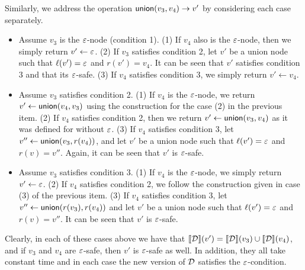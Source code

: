 	
	Similarly, we address the operation $\mathsf{union}(v_3, v_4) \to v'$ by considering each case separately.
	\begin{itemize}
		\item Assume $v_3$ is the $\varepsilon$-node (condition 1). (1) If $v_4$ also is the $\varepsilon$-node, then we simply return $v'\gets\varepsilon$. (2) If $v_3$ satisfies condition 2, let $v'$ be a union node such that $\ell(v') = \varepsilon$ and $r(v') = v_4$. It can be seen that $v'$ satisfies condition 3 and that its $\varepsilon$-safe. (3) If $v_4$ satisfies condition 3, we simply return $v'\gets v_4$.
		\item Assume $v_3$ satisfies condition 2. (1) If $v_4$ is the $\varepsilon$-node, we return $v'\gets \mathsf{union}( v_4, v_3)$ using the construction for the case (2) in the previous item. (2) If $v_4$ satisfies condition 2, then we return $v'\gets \mathsf{union}( v_3, v_4)$ as it was defined for \dsabbrs without $\varepsilon$. (3) If $v_4$ satisfies condition 3, let $v'' \gets \mathsf{union}( v_3, r(v_4))$, and let $v'$ be a union node such that $\ell(v') = \varepsilon$ and $r(v) = v''$. Again, it can be seen that $v'$ is $\varepsilon$-safe.
		\item Assume $v_3$ satisfies condition 3. (1) If $v_4$ is the $\varepsilon$-node, we simply return $v'\gets\varepsilon$. (2) If $v_4$ satisfies condition 2, we follow the construction given in case (3) of the previous item. (3) If $v_4$ satisfies condition 3, let $v''\gets\mathsf{union}( r(v_3), r(v_4))$ and let $v'$ be a union node such that $\ell(v') = \varepsilon$ and $r(v) = v''$. It can be seen that $v'$ is $\varepsilon$-safe.
	\end{itemize}
	
	Clearly, in each of these cases above we have that ${\llbracket{\mathcal{D}}\rrbracket}(v') = {\llbracket{\mathcal{D}}\rrbracket}(v_3)\cup {\llbracket{\mathcal{D}}\rrbracket}(v_4)$, and if $v_3$ and $v_4$ are $\varepsilon$-safe, then $v'$ is $\varepsilon$-safe as well. In addition, they all take constant time and in each case the new version of $\mathcal{D}$ satisfies the $\varepsilon$-condition.
	
